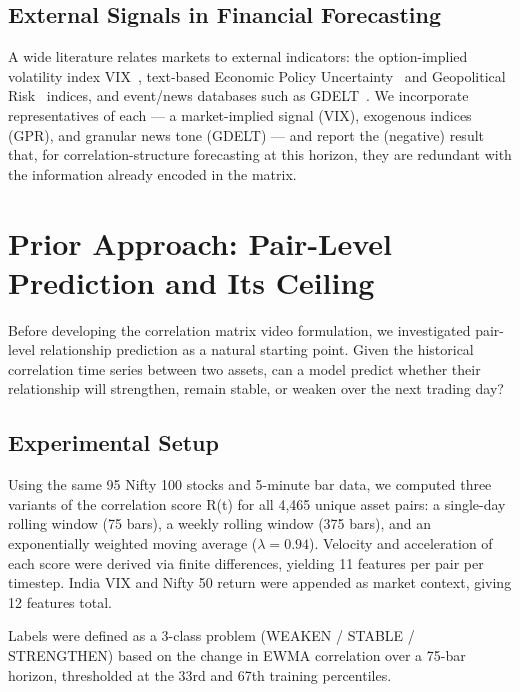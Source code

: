 \documentclass[runningheads]{llncs}
\begin{document}
\subsection{External Signals in Financial Forecasting}

A wide literature relates markets to external indicators: the
option-implied volatility index VIX~\cite{whaley2009understanding},
text-based Economic Policy Uncertainty~\cite{baker2016measuring} and
Geopolitical Risk~\cite{caldara2022measuring} indices, and event/news
databases such as GDELT~\cite{leetaru2013gdelt}. We incorporate
representatives of each --- a market-implied signal (VIX), exogenous
indices (GPR), and granular news tone (GDELT) --- and report the
(negative) result that, for correlation-structure forecasting at this
horizon, they are redundant with the information already encoded in the
matrix.

\section{Prior Approach: Pair-Level Prediction and Its Ceiling}
\label{sec:trial1}

Before developing the correlation matrix video formulation, we
investigated pair-level relationship prediction as a natural starting
point. Given the historical correlation time series between two assets,
can a model predict whether their relationship will strengthen, remain
stable, or weaken over the next trading day?

\subsection{Experimental Setup}

Using the same 95 Nifty 100 stocks and 5-minute bar data, we computed
three variants of the correlation score R(t) for all 4,465 unique asset
pairs: a single-day rolling window (75 bars), a weekly rolling window
(375 bars), and an exponentially weighted moving average ($\lambda=0.94$).
Velocity and acceleration of each score were derived via finite
differences, yielding 11 features per pair per timestep. India VIX and
Nifty 50 return were appended as market context, giving 12 features total.

Labels were defined as a 3-class problem (WEAKEN / STABLE / STRENGTHEN)
based on the change in EWMA correlation over a 75-bar horizon, thresholded
at the 33rd and 67th training percentiles.
\end{document}
